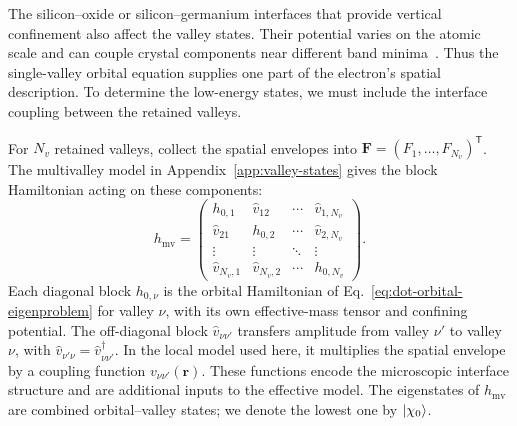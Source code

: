 The silicon--oxide or silicon--germanium interfaces that provide
vertical confinement also affect the valley states. Their potential
varies on the atomic scale and can couple crystal components near
different band minima~\cite{Friesen2010}. Thus the single-valley
orbital equation supplies one part of the electron's spatial
description. To determine the low-energy states, we must include
the interface coupling between the retained valleys.

For $N_v$ retained valleys, collect the spatial envelopes into
$\mathbf F=(F_1,\ldots,F_{N_v})^{\mathsf T}$.
The multivalley model in Appendix~\ref{app:valley-states} gives
the block Hamiltonian acting on these components:
\begin{equation}
 h_{\mathrm{mv}}=
 \begin{pmatrix}
  h_{0,1} & \hat v_{12} & \cdots & \hat v_{1,N_v}\\
  \hat v_{21} & h_{0,2} & \cdots & \hat v_{2,N_v}\\
  \vdots & \vdots & \ddots & \vdots\\
  \hat v_{N_v,1} & \hat v_{N_v,2} & \cdots & h_{0,N_v}
 \end{pmatrix}.
 \label{eq:dot-coupled-valley-equations}
\end{equation}
Each diagonal block $h_{0,\nu}$ is the orbital Hamiltonian
of Eq.~\eqref{eq:dot-orbital-eigenproblem} for valley $\nu$,
with its own effective-mass tensor and confining potential.
The off-diagonal block $\hat v_{\nu\nu'}$ transfers amplitude
from valley $\nu'$ to valley $\nu$, with
$\hat v_{\nu'\nu}=\hat v_{\nu\nu'}^\dagger$.
In the local model used here, it multiplies the spatial envelope
by a coupling function $v_{\nu\nu'}(\mathbf r)$. These functions
encode the microscopic interface structure and are additional
inputs to the effective model. The eigenstates of
$h_{\mathrm{mv}}$ are combined orbital--valley states; we denote
the lowest one by $\lvert \chi_0\rangle$.

